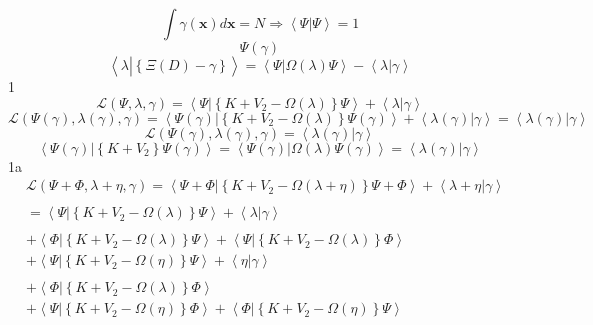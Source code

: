 \documentclass[aps,preprint]{revtex4}%
\begin{document}
\[
\int\gamma\left(  \mathbf{x}\right)  d\mathbf{x=}N\Rightarrow\left\langle
\left.  \Psi\right\vert \Psi\right\rangle =1
\]%
\[
\Psi\left(  \gamma\right)
\]%
\[
\left\langle \lambda\left\vert \overset{}{\left\{  \Xi\left(  D\right)
-\gamma\right\}  }\right.  \right\rangle =\left\langle \left.  \Psi\right\vert
\Omega\left(  \lambda\right)  \Psi\right\rangle -\left\langle \lambda
\left\vert \gamma\right.  \right\rangle
\]
1%
\[
\mathcal{L}\left(  \Psi,\lambda,\gamma\right)  =\left\langle \left.
\Psi\right\vert \left\{  K+V_{2}-\Omega\left(  \lambda\right)  \right\}
\Psi\right\rangle +\left\langle \lambda\left\vert \gamma\right.
\right\rangle
\]%
\[
\mathcal{L}\left(  \Psi\left(  \gamma\right)  ,\lambda\left(  \gamma\right)
,\gamma\right)  =\left\langle \left.  \Psi\left(  \gamma\right)  \right\vert
\left\{  K+V_{2}-\Omega\left(  \lambda\right)  \right\}  \Psi\left(
\gamma\right)  \right\rangle +\left\langle \lambda\left(  \gamma\right)
\left\vert \gamma\right.  \right\rangle =\left\langle \lambda\left(
\gamma\right)  \left\vert \gamma\right.  \right\rangle
\]%
\[
\mathcal{L}\left(  \Psi\left(  \gamma\right)  ,\lambda\left(  \gamma\right)
,\gamma\right)  =\left\langle \lambda\left(  \gamma\right)  \left\vert
\gamma\right.  \right\rangle
\]%
\[
\left\langle \left.  \Psi\left(  \gamma\right)  \right\vert \left\{
K+V_{2}\right\}  \Psi\left(  \gamma\right)  \right\rangle =\left\langle
\left.  \Psi\left(  \gamma\right)  \right\vert \Omega\left(  \lambda\right)
\Psi\left(  \gamma\right)  \right\rangle =\left\langle \lambda\left(
\gamma\right)  \left\vert \gamma\right.  \right\rangle
\]
1a%
\begin{align*}
&  \mathcal{L}\left(  \Psi+\Phi,\lambda+\eta,\gamma\right)  =\left\langle
\left.  \Psi+\Phi\right\vert \left\{  K+V_{2}-\Omega\left(  \lambda
+\eta\right)  \right\}  \Psi+\Phi\right\rangle +\left\langle \lambda
+\eta\left\vert \gamma\right.  \right\rangle \\
& \\
&  =\left\langle \left.  \Psi\right\vert \left\{  K+V_{2}-\Omega\left(
\lambda\right)  \right\}  \Psi\right\rangle +\left\langle \lambda\left\vert
\gamma\right.  \right\rangle \\
& \\
&  +\left\langle \left.  \Phi\right\vert \left\{  K+V_{2}-\Omega\left(
\lambda\right)  \right\}  \Psi\right\rangle +\left\langle \left.
\Psi\right\vert \left\{  K+V_{2}-\Omega\left(  \lambda\right)  \right\}
\Phi\right\rangle \\
&  +\left\langle \left.  \Psi\right\vert \left\{  K+V_{2}-\Omega\left(
\eta\right)  \right\}  \Psi\right\rangle +\left\langle \eta\left\vert
\gamma\right.  \right\rangle \\
& \\
&  +\left\langle \left.  \Phi\right\vert \left\{  K+V_{2}-\Omega\left(
\lambda\right)  \right\}  \Phi\right\rangle \\
&  +\left\langle \left.  \Psi\right\vert \left\{  K+V_{2}-\Omega\left(
\eta\right)  \right\}  \Phi\right\rangle +\left\langle \left.  \Phi\right\vert
\left\{  K+V_{2}-\Omega\left(  \eta\right)  \right\}  \Psi\right\rangle
\end{align*}
\end{document}

